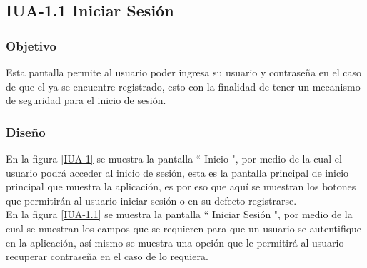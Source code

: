 \subsection{IUA-1.1 Iniciar Sesión}

\subsubsection{Objetivo}

	
    Esta pantalla permite al usuario poder ingresa su usuario y contraseña en el caso de que el ya se encuentre registrado, esto con la finalidad de tener un mecanismo de seguridad para el inicio de sesión.

\subsubsection{Diseño}


    En la figura \ref{IUA-1} se muestra la pantalla `` Inicio ", por medio de la cual el usuario podrá acceder al inicio de sesión, esta es la pantalla principal de inicio principal que muestra la aplicación, es por eso que aquí se muestran los botones que permitirán al usuario iniciar sesión o en su defecto registrarse.\\
    
    En la figura \ref{IUA-1.1} se muestra la pantalla `` Iniciar Sesión ", por medio de la cual se muestran los campos que se requieren para que un usuario se autentifique en la aplicación, así mismo se muestra una opción que le permitirá al usuario recuperar contraseña en el caso de lo requiera.


